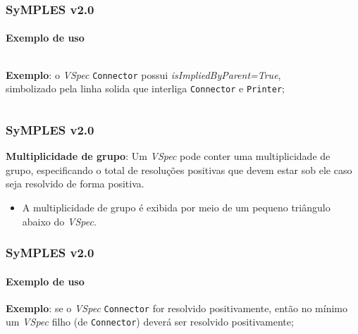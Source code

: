 \begin{frame}
\frametitle{SyMPLES v2.0}
\framesubtitle{Exemplo de uso}
  
  \begin{columns}[onlytextwidth]
    
    \begin{column}{0.6\textwidth}
      \textbf{Exemplo}: o \textit{VSpec} \texttt{Connector} possui \textit{isImpliedByParent=True}, simbolizado pela linha solida que interliga \texttt{Connector} e \texttt{Printer};
    \end{column}
  
    \begin{column}{0.4\textwidth}
      \begin{figure}
      \end{figure}
    \end{column}
    
  \end{columns}

\end{frame}


\begin{frame}
\frametitle{SyMPLES v2.0}

  \textbf{Multiplicidade de grupo}: Um \textit{VSpec} pode conter uma multiplicidade de grupo, especificando o total de resoluções positivas que devem estar sob ele caso seja resolvido de forma positiva.
  
  \begin{itemize}
    \item {
      A multiplicidade de grupo é exibida por meio de um pequeno triângulo abaixo do \textit{VSpec}.
    }
  \end{itemize}

\end{frame}


\begin{frame}
\frametitle{SyMPLES v2.0}
\framesubtitle{Exemplo de uso}

  \begin{figure}
  \end{figure}
  
  \textbf{Exemplo}: se o \textit{VSpec} \texttt{Connector} for resolvido positivamente, então no mínimo um \textit{VSpec} filho (de \texttt{Connector}) deverá ser resolvido positivamente;

\end{frame}

